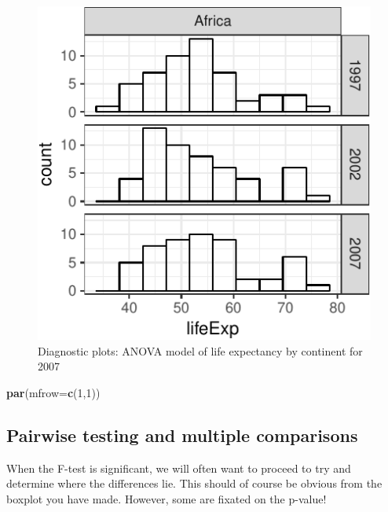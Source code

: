 \documentclass[12pt,]{krantz}
\makeatletter
\newenvironment{Shaded}{\begin{snugshade}}{\end{snugshade}}
\newcommand{\DataTypeTok}[1]{\textcolor[rgb]{0.13,0.29,0.53}{#1}}
\newcommand{\DecValTok}[1]{\textcolor[rgb]{0.00,0.00,0.81}{#1}}
\newcommand{\KeywordTok}[1]{\textcolor[rgb]{0.13,0.29,0.53}{\textbf{#1}}}
\newcommand{\NormalTok}[1]{#1}
\newcommand{\OperatorTok}[1]{\textcolor[rgb]{0.81,0.36,0.00}{\textbf{#1}}}
\newcommand{\StringTok}[1]{\textcolor[rgb]{0.31,0.60,0.02}{#1}}
\newenvironment{kframe}{%
\medskip{}
\setlength{\fboxsep}{.8em}
 \def\at@end@of@kframe{}%
 \ifinner\ifhmode%
  \def\at@end@of@kframe{\end{minipage}}%
  \begin{minipage}{\columnwidth}%
 \fi\fi%
 \def\FrameCommand##1{\hskip\@totalleftmargin \hskip-\fboxsep
 \colorbox{shadecolor}{##1}\hskip-\fboxsep
     \hskip-\linewidth \hskip-\@totalleftmargin \hskip\columnwidth}%
 \MakeFramed {\advance\hsize-\width
   \@totalleftmargin\z@ \linewidth\hsize
   \@setminipage}}%
 {\par\unskip\endMakeFramed%
 \at@end@of@kframe}
\renewenvironment{Shaded}{\begin{kframe}}{\end{kframe}}
\theoremstyle{definition}
\theoremstyle{definition}
\theoremstyle{definition}
\theoremstyle{remark}
\makeatother
\begin{document}
\begin{figure}
\centering
\includegraphics{06_tests_continuous_files/figure-latex/unnamed-chunk-20-1.pdf}
\caption{\label{fig:unnamed-chunk-20}Diagnostic plots: ANOVA model of life
expectancy by continent for 2007}
\end{figure}

\begin{Shaded}
\begin{Highlighting}[]
\KeywordTok{par}\NormalTok{(}\DataTypeTok{mfrow=}\KeywordTok{c}\NormalTok{(}\DecValTok{1}\NormalTok{,}\DecValTok{1}\NormalTok{))}
\end{Highlighting}
\end{Shaded}

\hypertarget{pairwise-testing-and-multiple-comparisons}{%
\subsection{Pairwise testing and multiple
comparisons}\label{pairwise-testing-and-multiple-comparisons}}


When the F-test is significant, we will often want to proceed to try and
determine where the differences lie. This should of course be obvious
from the boxplot you have made. However, some are fixated on the
p-value!

\begin{Shaded}
\end{Shaded}
\end{document}
